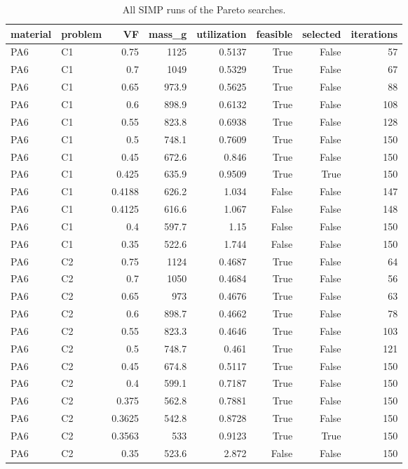\begin{table}[htbp]
\centering
\caption{All SIMP runs of the Pareto searches.}
\label{tab:T10_06_pareto_runs}
\begin{tabular}{llrrrrrr}
\toprule
material & problem & VF & mass\_g & utilization & feasible & selected & iterations \\
\midrule
PA6 & C1 & 0.75 & 1125 & 0.5137 & True & False & 57 \\
PA6 & C1 & 0.7 & 1049 & 0.5329 & True & False & 67 \\
PA6 & C1 & 0.65 & 973.9 & 0.5625 & True & False & 88 \\
PA6 & C1 & 0.6 & 898.9 & 0.6132 & True & False & 108 \\
PA6 & C1 & 0.55 & 823.8 & 0.6938 & True & False & 128 \\
PA6 & C1 & 0.5 & 748.1 & 0.7609 & True & False & 150 \\
PA6 & C1 & 0.45 & 672.6 & 0.846 & True & False & 150 \\
PA6 & C1 & 0.425 & 635.9 & 0.9509 & True & True & 150 \\
PA6 & C1 & 0.4188 & 626.2 & 1.034 & False & False & 147 \\
PA6 & C1 & 0.4125 & 616.6 & 1.067 & False & False & 148 \\
PA6 & C1 & 0.4 & 597.7 & 1.15 & False & False & 150 \\
PA6 & C1 & 0.35 & 522.6 & 1.744 & False & False & 150 \\
PA6 & C2 & 0.75 & 1124 & 0.4687 & True & False & 64 \\
PA6 & C2 & 0.7 & 1050 & 0.4684 & True & False & 56 \\
PA6 & C2 & 0.65 & 973 & 0.4676 & True & False & 63 \\
PA6 & C2 & 0.6 & 898.7 & 0.4662 & True & False & 78 \\
PA6 & C2 & 0.55 & 823.3 & 0.4646 & True & False & 103 \\
PA6 & C2 & 0.5 & 748.7 & 0.461 & True & False & 121 \\
PA6 & C2 & 0.45 & 674.8 & 0.5117 & True & False & 150 \\
PA6 & C2 & 0.4 & 599.1 & 0.7187 & True & False & 150 \\
PA6 & C2 & 0.375 & 562.8 & 0.7881 & True & False & 150 \\
PA6 & C2 & 0.3625 & 542.8 & 0.8728 & True & False & 150 \\
PA6 & C2 & 0.3563 & 533 & 0.9123 & True & True & 150 \\
PA6 & C2 & 0.35 & 523.6 & 2.872 & False & False & 150 \\

\end{tabular}
\end{table}
